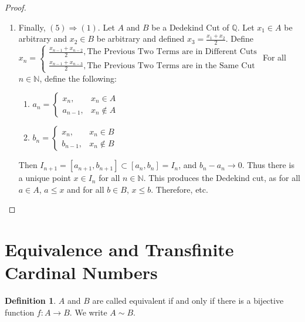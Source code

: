 \documentclass[oneside]{book}
\theoremstyle{definition}
\newtheorem{definition}{Definition}[section]
\begin{document}
\begin{proof}
\begin{enumerate}
\item Finally, $(5)\Rightarrow (1)$. Let $A$ and $B$ be a Dedekind Cut of $\mathbb{Q}$. Let $x_1 \in A$ be arbitrary and $x_2 \in B$ be arbitrary and defined $x_3 = \frac{x_1+x_2}{2}$. Define\\ $x_n = \begin{cases} \frac{x_{n-1}+x_{n-2}}{2}, \textrm{The Previous Two Terms are in Different Cuts}\\\frac{x_{n-1}+x_{n-3}}{2}, \textrm{The Previous Two Terms are in the Same Cut}\end{cases}$
For all $n\in \mathbb{N}$, define the following:
\begin{paracol}{2}
\begin{enumerate}
\item $a_n = \begin{cases} x_n, & x_n \in A \\ a_{n-1}, & x_n \notin A\end{cases}$
\switchcolumn
\item $b_n = \begin{cases} x_n, & x_n \in B \\ b_{n-1}, & x_n \notin B\end{cases}$
\end{enumerate}
\end{paracol}
Then $I_{n+1} = [a_{n+1},b_{n+1}] \subset [a_n,b_n]=I_n$, and $b_n-a_n \rightarrow 0$. Thus there is a unique point $x\in I_n$ for all $n\in \mathbb{N}$. This produces the Dedekind cut, as for all $a\in A$, $a\leq x$ and for all $b\in B$, $x\leq b$. Therefore, etc.
\end{enumerate}
\end{proof}

\section{Equivalence and Transfinite Cardinal Numbers}

\begin{definition}
$A$ and $B$ are called equivalent if and only if there is a bijective function $f:A\rightarrow B$. We write $A\sim B$.
\end{definition}
\end{document}
